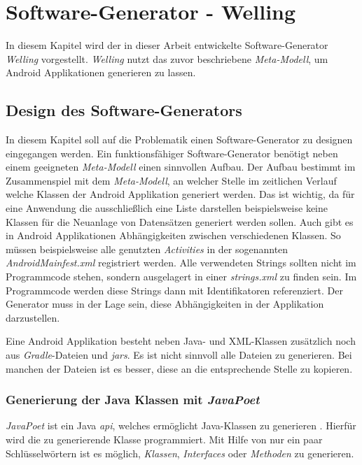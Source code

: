 \chapter{Software-Generator - Welling}
In diesem Kapitel wird der in dieser Arbeit entwickelte Software-Generator \textit{Welling} vorgestellt. \textit{Welling} nutzt das zuvor beschriebene \textit{Meta-Modell}, um Android Applikationen generieren zu lassen. 

\section{Design des Software-Generators}
In diesem Kapitel soll auf die Problematik einen Software-Generator zu designen eingegangen werden. Ein funktionsfähiger Software-Generator benötigt neben einem geeigneten \textit{Meta-Modell} einen sinnvollen Aufbau. Der Aufbau bestimmt im Zusammenspiel mit dem \textit{Meta-Modell}, an welcher Stelle im zeitlichen Verlauf welche Klassen der Android Applikation generiert werden. Das ist wichtig, da für eine Anwendung die ausschließlich eine Liste darstellen beispielsweise keine Klassen für die Neuanlage von Datensätzen generiert werden sollen. 
Auch gibt es in Android Applikationen Abhängigkeiten zwischen verschiedenen Klassen. So müssen beispielsweise alle genutzten \textit{Activities} in der sogenannten \textit{AndroidMainfest.xml} registriert werden. Alle verwendeten Strings sollten nicht im Programmcode stehen, sondern ausgelagert in einer \textit{strings.xml} zu finden sein. Im Programmcode werden diese Strings dann mit Identifikatoren referenziert. Der Generator muss in der Lage sein, diese Abhängigkeiten in der Applikation darzustellen. 

Eine Android Applikation besteht neben Java- und XML-Klassen zusätzlich noch aus \textit{Gradle}-Dateien und \textit{\acfp{jar}}. Es ist nicht sinnvoll alle Dateien zu generieren. Bei manchen der Dateien ist es besser, diese an die entsprechende Stelle zu kopieren.

\subsection{Generierung der Java Klassen mit \textit{JavaPoet}}
\textit{JavaPoet} ist ein Java \textit{\ac{api}}, welches ermöglicht Java-Klassen zu generieren \cite{poet}. Hierfür wird die zu generierende Klasse programmiert. Mit Hilfe von nur ein paar Schlüsselwörtern ist es möglich, \textit{Klassen}, \textit{Interfaces} oder \textit{Methoden} zu generieren. 

